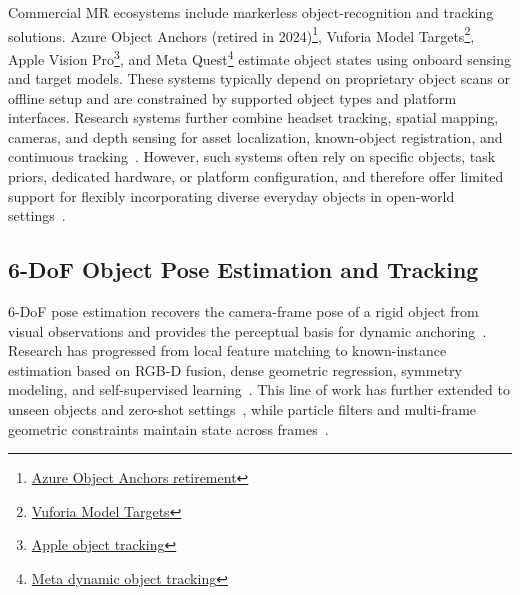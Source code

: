 \documentclass[review]{vgtc}
\begin{document}
Commercial MR ecosystems include markerless object-recognition and tracking solutions. Azure Object Anchors (retired in 2024)\footnote{\href{https://learn.microsoft.com/en-us/lifecycle/end-of-support/end-of-support-2024}{Azure Object Anchors retirement}}, Vuforia Model Targets\footnote{\href{https://developer.vuforia.com/library/vuforia-engine/images-and-objects/model-targets/model-targets/}{Vuforia Model Targets}}, Apple Vision Pro\footnote{\href{https://developer.apple.com/documentation/visionos/implementing-object-tracking-in-your-app}{Apple object tracking}}, and Meta Quest\footnote{\href{https://developers.meta.com/horizon/documentation/native/android/mobile-dynamic-object-tracker/}{Meta dynamic object tracking}} estimate object states using onboard sensing and target models. These systems typically depend on proprietary object scans or offline setup and are constrained by supported object types and platform interfaces. Research systems further combine headset tracking, spatial mapping, cameras, and depth sensing for asset localization, known-object registration, and continuous tracking~\cite{fan2021assettracking,doughty2022hmdegopose,pollabauer2023hololens,martingomez2024sttar,trojak2025mixedpose,greene2025markerless,trojak2026markerless,gbot2024}. However, such systems often rely on specific objects, task priors, dedicated hardware, or platform configuration, and therefore offer limited support for flexibly incorporating diverse everyday objects in open-world settings~\cite{hurt2025surrealitycv}.

\subsection{6-DoF Object Pose Estimation and Tracking}

6-DoF pose estimation recovers the camera-frame pose of a rigid object from visual observations and provides the perceptual basis for dynamic anchoring~\cite{aguirrezabal2026survey}. Research has progressed from local feature matching to known-instance estimation based on RGB-D fusion, dense geometric regression, symmetry modeling, and self-supervised learning~\cite{densefusion2019,epos2020,gdrnet2021,self6d2020}. This line of work has further extended to unseen objects and zero-shot settings~\cite{gen6d2022,megapose2022,lin2024sam6d,ornek2024foundpose,moon2025coop,foundationpose2024}, while particle filters and multi-frame geometric constraints maintain state across frames~\cite{poserbpf2021,bundletrack2021}.
\end{document}
